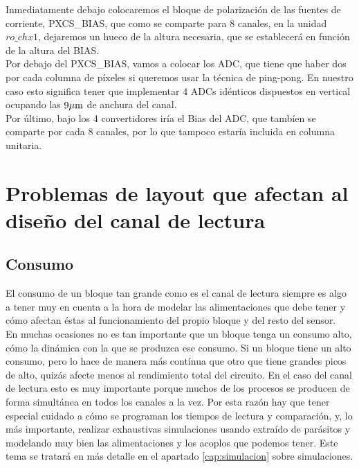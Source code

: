 Inmediatamente debajo colocaremos el bloque de polarización de las fuentes de
corriente, PXCS\_BIAS, que como se comparte para 8 canales, en la unidad $ro\_chx1$,
dejaremos un hueco de la altura necesaria, que se establecerá en función de la altura
del BIAS.\\

Por debajo del PXCS\_BIAS, vamos a colocar los ADC, que tiene que haber dos por
cada columna de píxeles si queremos usar la técnica de ping-pong. En nuestro caso
esto significa tener que implementar 4 ADCs idénticos dispuestos en vertical ocupando
las $9\mu\text{m}$ de anchura del canal.\\

Por último, bajo los 4 convertidores iría el Bias del ADC, que tambíen se comparte
por cada 8 canales, por lo que tampoco estaría incluida en columna unitaria.\\

\section{Problemas de layout que afectan al diseño del canal de lectura}

\subsection{Consumo}

El consumo de un bloque tan grande como es el canal de lectura siempre es algo a
tener muy en cuenta a la hora de modelar las alimentaciones que debe tener y
cómo afectan éstas al funcionamiento del propio bloque y del resto del sensor.\\

En muchas ocasiones no es tan importante que un bloque tenga un consumo alto,
cómo la dinámica con la que se produzca ese consumo. Si un bloque tiene un alto
consumo, pero lo hace de manera más contínua que otro que tiene grandes picos de
alto, quizás afecte menos al rendimiento total del circuito. En el caso del
canal de lectura esto es muy importante porque muchos de los procesos se producen
de forma simultánea en todos los canales a la vez. Por esta razón hay que tener
especial cuidado a cómo se programan los tiempos de lectura y comparación,
y, lo más importante, realizar exhaustivas simulaciones usando extraído de parásitos
y modelando muy bien las alimentaciones y los acoplos que podemos tener. Este tema
se tratará en más detalle en el apartado \ref{cap:simulacion} sobre simulaciones.\\

